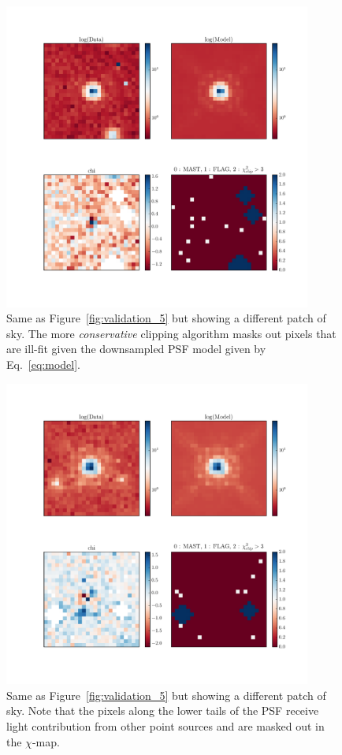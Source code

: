\begin{figure}
\includegraphics[width=0.9\textwidth]{figures/wfc3ir/example16.pdf}
\caption{\label{fig:validation_6} Same as Figure~\ref{fig:validation_5} but showing a different patch of sky. The more \emph{conservative} clipping algorithm masks out pixels that are ill-fit given the downsampled PSF model given by Eq.~\ref{eq:model}.}
\end{figure}

\begin{figure}
\includegraphics[width=0.9\textwidth]{figures/wfc3ir/example19.pdf}
\caption{\label{fig:validation_7} Same as Figure~\ref{fig:validation_5} but showing a different patch of sky. Note that the pixels along the lower tails of the PSF receive light contribution from other point sources and are masked out in the $\chi$-map.}
\end{figure}


